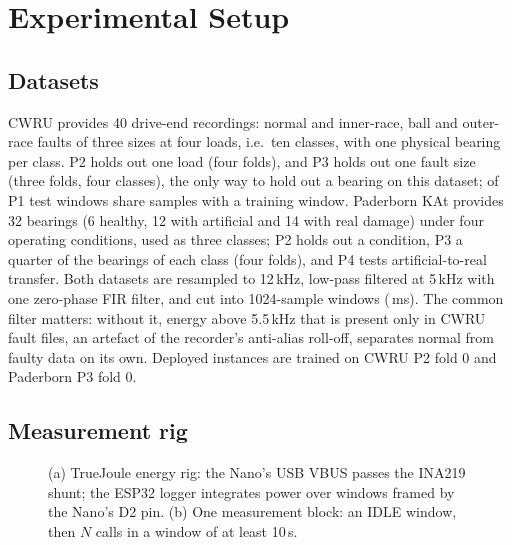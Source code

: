 \documentclass[conference]{IEEEtran}
\newcommand{\TJ}{TrueJoule}
\begin{document}
\section{Experimental Setup}\label{sec:setup}
\subsection{Datasets}
CWRU \cite{cwru,smith2015rolling} provides 40 drive-end recordings: normal and inner-race, ball and outer-race faults of
three sizes at four loads, i.e.\ ten classes, with one physical bearing per class. P2 holds out one load (four folds),
and P3 holds out one fault size (three folds, four classes), the only way to hold out a bearing on this dataset;
\NumHostPOneLeakPct{} of P1 test windows share samples with a training window. Paderborn KAt
\cite{lessmeier2016condition} provides 32 bearings (6 healthy, 12 with artificial and 14 with real damage) under four
operating conditions, used as three classes; P2 holds out a condition, P3 a quarter of the bearings of each class
(four folds), and P4 tests artificial-to-real transfer. Both datasets are resampled to 12\,kHz, low-pass filtered at
5\,kHz with one zero-phase FIR filter, and cut into 1024-sample windows (\NumWindowMs\,ms). The common filter matters:
without it, energy above 5.5\,kHz that is present only in CWRU fault files, an artefact of the recorder's anti-alias
roll-off, separates normal from faulty data on its own. Deployed instances are trained on CWRU P2 fold 0 and Paderborn
P3 fold 0.

\subsection{Measurement rig}\label{sec:setup-rig}
\begin{figure}[t]
\centering
\resizebox{\columnwidth}{!}{}
\caption{(a) \TJ{} energy rig: the Nano's USB VBUS passes the INA219 shunt; the ESP32 logger integrates power over
windows framed by the Nano's D2 pin. (b) One measurement block: an IDLE window, then $N$ calls in a window of at
least 10\,s.}
\label{fig:rig}
\end{figure}
\end{document}
